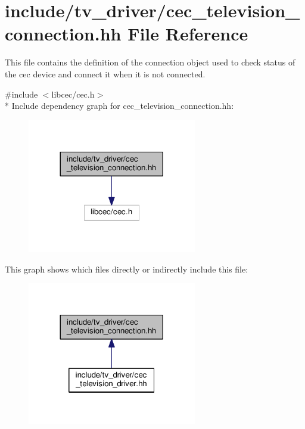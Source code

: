 \hypertarget{cec__television__connection_8hh}{\section{include/tv\+\_\+driver/cec\+\_\+television\+\_\+connection.hh File Reference}
\label{cec__television__connection_8hh}
}


This file contains the definition of the connection object used to check status of the cec device and connect it when it is not connected.  


{\ttfamily \#include $<$libcec/cec.\+h$>$}\\*
Include dependency graph for cec\+\_\+television\+\_\+connection.\+hh\+:
\nopagebreak
\begin{figure}[H]
\begin{center}
\leavevmode
\includegraphics[width=209pt]{cec__television__connection_8hh__incl}
\end{center}
\end{figure}
This graph shows which files directly or indirectly include this file\+:
\nopagebreak
\begin{figure}[H]
\begin{center}
\leavevmode
\includegraphics[width=209pt]{cec__television__connection_8hh__dep__incl}
\end{center}
\end{figure}
